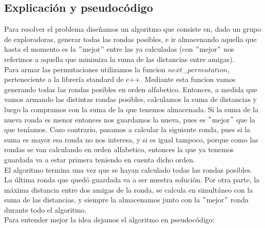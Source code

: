 \subsection{Explicación y pseudocódigo}
Para resolver el problema diseñamos un algoritmo que consiste en, dado un grupo de exploradoras, generar todas las rondas 
posibles, e ir almacenando aquella que hasta el momento es la $"$mejor$"$ entre las ya calculadas (con $"$mejor$"$ nos referimos a 
aquella que minimiza la suma de las distancias entre amigas).\\
Para armar las permutaciones utilizamos la funcion $next$\_$permutation$, perteneciente a la librería standard de c++. Mediante 
esta funcion vamos generando todas las rondas posibles en orden alfabetico. Entonces, a medida que vamos armando las 
distintas rondas posibles, calculamos la suma de distancias y luego la compramos con la suma de la que tenemos almacenada. Si 
la suma de la nueva ronda es menor entonces nos guardamos la nueva, pues es $"$mejor$"$ que la que teníamos. Caso contrario, 
pasamos a calcular la siguiente ronda, pues si la suma es mayor esa ronda no nos interesa, y si es igual tampoco, porque como
las rondas se van calculando en orden alfabetico, entonces la que ya tenemos guardada va a estar primera teniendo en cuenta
dicho orden. \\
El algoritmo termina una vez que se hayan calculado todas las rondas posibles. La última ronda que quedó guardada va a ser nuestra solución. Por otra parte, la máxima distancia entre dos amigas de la ronda, se calcula en simultáneo con la suma de las distancias, y siempre la almacenamos junto con la $"$mejor$"$ ronda durante todo el algoritmo. \\
Para entender mejor la idea dejamos el algoritmo en pseudocódigo:   


